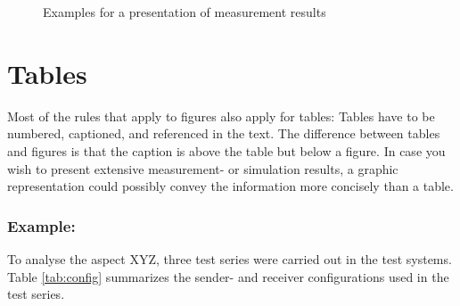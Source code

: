 \begin{figure}[ht]
    \centering
    \caption{\label{fig:plots}Examples for a presentation of measurement results}
\end{figure}


\section{Tables}
Most of the rules that apply to figures also apply for tables:
Tables have to be numbered, captioned, and referenced in the text.
The difference between tables and figures is that the caption is above the table but below a figure.
In case you wish to present extensive measurement- or simulation results, a graphic
representation could possibly convey the information more concisely than a table.

  \begin{example}
    \subsubsection*{Example:}
    To analyse the aspect XYZ, three test series were carried out
    in the test systems. Table \ref{tab:config} summarizes the
    sender- and receiver configurations used in the test series.
  \end{example}

